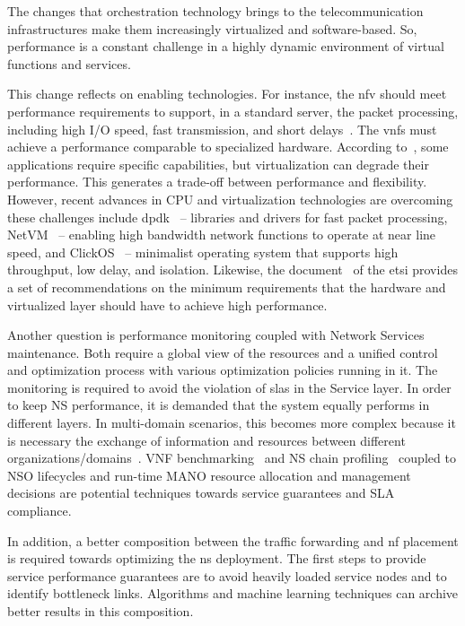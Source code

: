 The changes that orchestration technology brings to the telecommunication infrastructures make them increasingly virtualized and software-based. So, performance is a constant challenge in a highly dynamic environment of virtual functions and services.  

This change reflects on enabling technologies. For instance, the \gls{nfv} should meet performance requirements to support, in a standard server, the packet processing, including high I/O speed, fast transmission, and short delays~\cite{YongLi2015Software-DefinedSurvey}. The \glspl{vnf} must achieve a performance comparable to specialized hardware. According to~\cite{Mijumbi2016NetworkChallenges}, some applications require specific capabilities, but virtualization can degrade their performance. This generates a trade-off between performance and flexibility. However, recent advances in CPU and virtualization technologies are overcoming these challenges include \gls{dpdk}~\cite{LinuxFoundationDPDKKit} -- libraries and drivers for fast packet processing, NetVM~\cite{7036139} -- enabling high bandwidth network functions to operate at near line speed, and ClickOS~\cite{Martins:2014:CAN:2616448.2616491} -- minimalist operating system that supports high throughput, low delay, and isolation. Likewise, the document~\cite{ETSIGSPractises} of the \gls{etsi}  provides a set of recommendations on the minimum requirements that the hardware and virtualized layer should have to achieve high performance.

Another question is performance monitoring coupled with Network Services maintenance. Both require a global view of the resources and a unified control and optimization process with various optimization policies running in it. The monitoring is required to avoid the violation of \glspl{sla} in the Service layer. In order to keep NS performance, it is demanded that the system equally performs in different layers. In multi-domain scenarios, this becomes more complex because it is necessary the exchange of information and resources between different organizations/domains~\cite{md2}. 
VNF benchmarking~\cite{7313620} and NS chain profiling~\cite{7956044} coupled to NSO lifecycles and run-time MANO resource allocation and management decisions are potential techniques towards service guarantees and SLA compliance.  

In addition, a better composition between the traffic forwarding and \gls{nf} placement is required towards optimizing the \gls{ns} deployment. The first steps to provide service performance guarantees are to avoid heavily loaded service nodes and to identify bottleneck links. Algorithms and machine learning techniques can archive better results in this composition.   


